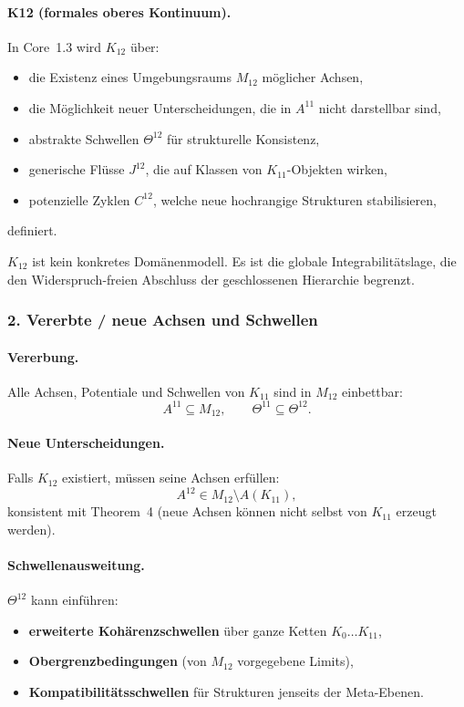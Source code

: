 \paragraph{K12 (formales oberes Kontinuum).}
In Core~1.3 wird $K_{12}$ über:
\begin{itemize}
  \item die Existenz eines Umgebungsraums $M_{12}$ möglicher Achsen,
  \item die Möglichkeit neuer Unterscheidungen, die in $A^{11}$ nicht darstellbar sind,
  \item abstrakte Schwellen $\Theta^{12}$ für strukturelle Konsistenz,
  \item generische Flüsse $J^{12}$, die auf Klassen von $K_{11}$-Objekten wirken,
  \item potenzielle Zyklen $C^{12}$, welche neue hochrangige Strukturen stabilisieren,
\end{itemize}
definiert.

$K_{12}$ ist kein konkretes Domänenmodell. Es ist die globale Integrabilitätslage,
die den Widerspruch-freien Abschluss der geschlossenen Hierarchie begrenzt.

\subsubsection{2. Vererbte / neue Achsen und Schwellen}

\paragraph{Vererbung.}
Alle Achsen, Potentiale und Schwellen von $K_{11}$ sind in $M_{12}$ einbettbar:
\[
A^{11} \subseteq M_{12}, \qquad
\Theta^{11} \subseteq \Theta^{12}.
\]

\paragraph{Neue Unterscheidungen.}
Falls $K_{12}$ existiert, müssen seine Achsen erfüllen:
\[
A^{12} \in M_{12} \setminus A(K_{11}),
\]
konsistent mit Theorem~4 (neue Achsen können nicht selbst von $K_{11}$ erzeugt werden).

\paragraph{Schwellenausweitung.}
$\Theta^{12}$ kann einführen:
\begin{itemize}
  \item \textbf{erweiterte Kohärenzschwellen} über ganze Ketten
        $K_0\dots K_{11}$,
  \item \textbf{Obergrenzbedingungen} (von $M_{12}$ vorgegebene Limits),
  \item \textbf{Kompatibilitätsschwellen} für Strukturen jenseits der Meta-Ebenen.
\end{itemize}

